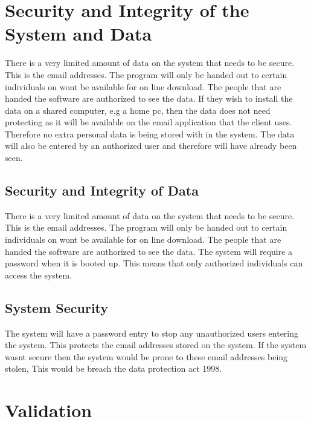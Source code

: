 \section{Security and Integrity of the System and Data}
There is a very limited amount of data on the system that needs to be secure. This is the email addresses. The program will only be handed out to certain individuals on wont be available for on line download. The people that are handed the software are authorized to see the data. If they wish to install the data on a shared computer, e.g a home pc, then the data does not need protecting as it will be available on the email application that the client uses. Therefore no extra personal data is being stored with in the system. The data will also be entered by an authorized user and therefore will have already been seen. 

\subsection{Security and Integrity of Data}
There is a very limited amount of data on the system that needs to be secure. This is the email addresses. The program will only be handed out to certain individuals on wont be available for on line download. The people that are handed the software are authorized to see the data. The system will require a password when it is booted up. This means that only authorized individuals can access the system.  

\subsection{System Security}
The system will have a password entry to stop any unauthorized users entering the system. This protects the email addresses stored on the system. If the system wasnt secure then the system would be prone to these email addresses being stolen, This would be breach the data protection act 1998. 
\section{Validation}

